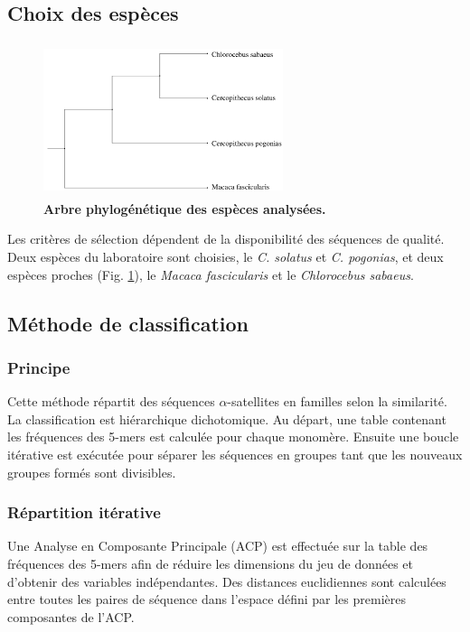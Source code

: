 \documentclass[12pt,a4paper]{article}
\begin{document}
\subsection{Choix des espèces}

	\begin{figure}
		\center
		\includegraphics[height=4.5cm, width=7cm]{img/arbre_especes.png}
		\caption{\textbf{Arbre phylogénétique des espèces analysées.}\cite{Cacheux_evolution}
		\label{fig:arbre_presentation}}
	\end{figure}

Les critères de sélection dépendent de la disponibilité des séquences de qualité. Deux espèces du laboratoire sont choisies, le \textit{C. solatus} et \textit{C. pogonias}, et deux espèces proches (Fig. \ref{fig:arbre_presentation}), le \textit{Macaca fascicularis} et le \textit{Chlorocebus sabaeus}.  

\subsection{Méthode de classification}
	\subsubsection{Principe}
Cette méthode \cite{rapport_florence} répartit des séquences $\alpha$-satellites en familles selon la similarité. La classification est hiérarchique dichotomique. Au départ, une table contenant les fréquences des 5-mers est calculée pour chaque monomère. Ensuite une boucle itérative est exécutée pour séparer les séquences en groupes tant que les nouveaux groupes formés sont divisibles.

	\subsubsection{Répartition itérative}
Une Analyse en Composante Principale (ACP) est effectuée sur la table des fréquences des 5-mers afin de réduire les dimensions du jeu de données et d’obtenir des variables indépendantes. Des distances euclidiennes sont calculées entre toutes les paires de séquence dans l’espace défini par les premières composantes de l’ACP. 
\end{document}
